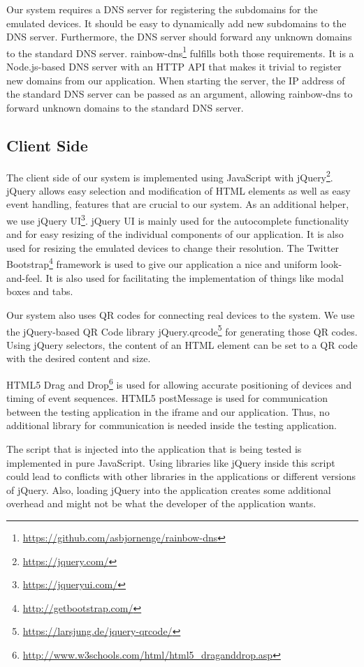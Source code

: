 Our system requires a DNS server for registering the subdomains for the emulated devices. It should be easy to dynamically add new subdomains to the DNS server. Furthermore, the DNS server should forward any unknown domains to the standard DNS server. rainbow-dns\footnote{\url{https://github.com/asbjornenge/rainbow-dns}} fulfills both those requirements. It is a Node.js-based DNS server with an HTTP API that makes it trivial to register new domains from our application. When starting the server, the IP address of the standard DNS server can be passed as an argument, allowing rainbow-dns to forward unknown domains to the standard DNS server.

\subsection{Client Side}

The client side of our system is implemented using JavaScript with jQuery\footnote{\url{https://jquery.com/}}. jQuery allows easy selection and modification of HTML elements as well as easy event handling, features that are crucial to our system. As an additional helper, we use jQuery UI\footnote{\url{https://jqueryui.com/}}. jQuery UI is mainly used for the autocomplete functionality and for easy resizing of the individual components of our application. It is also used for resizing the emulated devices to change their resolution. The Twitter Bootstrap\footnote{\url{http://getbootstrap.com/}} framework is used to give our application a nice and uniform look-and-feel. It is also used for facilitating the implementation of things like modal boxes and tabs. 

Our system also uses QR codes for connecting real devices to the system. We use the jQuery-based QR Code library jQuery.qrcode\footnote{\url{https://larsjung.de/jquery-qrcode/}} for generating those QR codes. Using jQuery selectors, the content of an HTML element can be set to a QR code with the desired content and size.

HTML5 Drag and Drop\footnote{\url{http://www.w3schools.com/html/html5_draganddrop.asp}} is used for allowing accurate positioning of devices and timing of event sequences. HTML5 postMessage is used for communication between the testing application in the iframe and our application. Thus, no additional library for communication is needed inside the testing application.

The script that is injected into the application that is being tested is implemented in pure JavaScript. Using libraries like jQuery inside this script could lead to conflicts with other libraries in the applications or different versions of jQuery. Also, loading jQuery into the application creates some additional overhead and might not be what the developer of the application wants.

